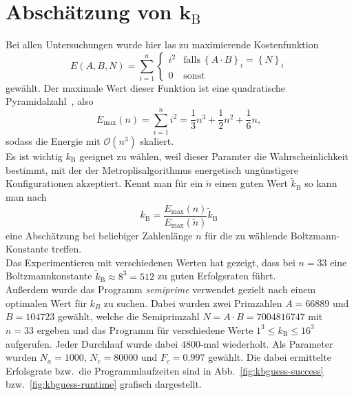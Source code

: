 \section{\texorpdfstring{Abschätzung von $\bm{k_\mathrm{B}}$}{Abschätzung von kB}}\label{sec:kbguess}
Bei allen Untersuchungen wurde hier las zu maximierende Kostenfunktion
\begin{equation*}
		E\left(A,B,N\right)=\sum\limits_{i=1}^n\begin{cases}
    i^2 & \mathrm{falls}\:{\left\{A\cdot B\right\}}_i={\left\{N\right\}}_i \\
	0 & \mathrm{sonst}
  \end{cases}
\end{equation*}
gewählt. Der maximale Wert dieser Funktion ist eine quadratische Pyramidalzahl~\parencite{oeis}, also
\begin{equation*}
		E_{\mathrm{\max}}\left(n\right)=\sum\limits_{i=1}^n i^2=\frac{1}{3}n^3+\frac{1}{2}n^2+\frac{1}{6}n,\label{eq:kbguess}
\end{equation*}
sodass die Energie mit $\mathcal{O}\left(n^3\right)$ skaliert. \\
Es ist wichtig $k_\mathrm{B}$ geeignet zu wählen, weil dieser Paramter die Wahrscheinlichkeit bestimmt, mit der der Metroplisalgorithmus energetisch ungünstigere Konfigurationen akzeptiert. Kennt man für ein $\tilde{n}$ einen guten Wert $\tilde{k}_\mathrm{B}$ so kann man nach
\begin{equation*}
		k_\mathrm{B}=\frac{E_{\mathrm{\max}}\left(n\right)}{E_{\mathrm{\max}}\left(\tilde{n}\right)}\tilde{k}_\mathrm{B}
\end{equation*}
eine Abschätzung bei beliebiger Zahlenlänge $n$ für die zu wählende Boltzmann-Konstante treffen. \\
Das Experimentieren mit verschiedenen Werten hat gezeigt, dass bei $n=33$ eine Boltzmannkonstante $\tilde{k}_\mathrm{B}\approx 8^3=512$ zu guten Erfolgsraten führt. \\
Außerdem wurde das Programm \textit{semiprime} verwendet gezielt nach einem optimalen Wert für $k_B$ zu suchen. Dabei wurden zwei Primzahlen $A=66889$ und $B=104723$ gewählt, welche die Semiprimzahl $N=A\cdot B=7004816747$ mit $n=33$ ergeben und das Programm für verschiedene Werte $1^3\leq k_\mathrm{B}\leq 16^3$ aufgerufen. Jeder Durchlauf wurde dabei $4800$-mal wiederholt. Als Parameter wurden $N_a=1000$, $N_c=80000$ und $F_c=0.997$ gewählt. Die dabei ermittelte Erfolsgrate bzw.\ die Programmlaufzeiten sind in Abb.~\ref{fig:kbguess-success} bzw.~\ref{fig:kbguess-runtime} grafisch dargestellt.\\
